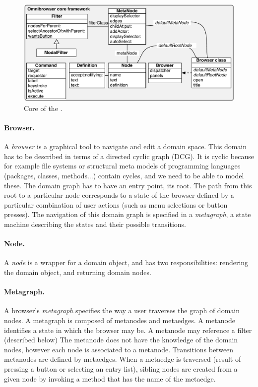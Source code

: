 \documentclass[a4paper,10pt,twoside]{book}
\begin{document}
\begin{figure}[!ht]
\begin{center}
\includegraphics[scale=0.59]{CoreOnly}
\caption{Core of the \obf. } 
\end{center}
\end{figure}

\paragraph{Browser.} A \emph{browser} is a graphical tool to navigate and edit a domain space. This domain has to be described in terms of a directed cyclic graph (DCG). It is cyclic because for example file systems or structural meta models of programming languages (\ie packages, classes, methods...) contain cycles, and we need to be able to model these. The domain graph has to have an entry point, its root. The path from this root to a particular node corresponds to a state of the browser defined by a particular combination of user actions (such as menu selections or button presses).
The navigation of this domain graph is specified in a \emph{metagraph}, a state machine describing the states and their possible transitions.

\paragraph{Node.} A \emph{node} is a wrapper for a domain object, and has two responsibilities: rendering the domain object, and returning domain nodes.


\paragraph{Metagraph.} A browser's \emph{metagraph} specifies the way a user traverses the graph of domain nodes. A metagraph is composed of metanodes and metaedges. A metanode identifies a state in which the browser may be. A metanode may reference a filter (described below)
The metanode does not have the knowledge of the domain nodes, however each node is associated to a metanode. Transitions between meta\-nodes are defined by metaedges. When a metaedge is traversed (\ie result of pressing a button or selecting an entry list), sibling nodes are created from a given node by invoking a method that has the name of the metaedge.
\end{document}
